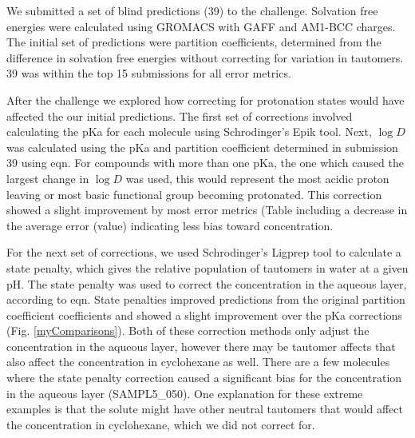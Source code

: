 We submitted a set of blind predictions (39) to the challenge. 
Solvation free energies were calculated using GROMACS with GAFF and AM1-BCC charges. 
The initial set of predictions were partition coefficients, determined from the difference in solvation free energies without correcting for variation in tautomers. 
39 was within the top 15 %
submissions for all error metrics.  

After the challenge we explored how correcting for protonation states would have affected the our initial predictions. 
The first set of corrections involved calculating the pKa for each molecule using Schrodinger's Epik tool. 
Next, $\log D$ was calculated using the pKa and partition coefficient determined in submission 39 using eqn. %
For compounds with more than one pKa, the one which caused the largest change in $\log D$ was used, this would represent the most acidic proton leaving or most basic functional group becoming protonated. %
This correction showed a slight improvement by most error metrics (Table %
including a decrease in the average error (value) indicating less bias toward concentration. 

For the next set of corrections, we used Schrodinger's Ligprep tool to calculate a state penalty, which gives the relative population of tautomers in water at a given pH. %
The state penalty was used to correct the concentration in the aqueous layer, according to eqn. %
State penalties improved predictions from the original partition coefficient coefficients and showed a slight improvement over the pKa corrections (Fig. \ref{myComparisons}). 
Both of these correction methods only adjust the concentration in the aqueous layer, however there may be tautomer affects that also affect the concentration in cyclohexane as well. 
There are a few molecules where the state penalty correction caused a significant bias for the concentration in the aqueous layer (SAMPL5\_050). %
One explanation for these extreme examples is that the solute might have other neutral tautomers that would affect the concentration in cyclohexane, which we did not correct for. 


